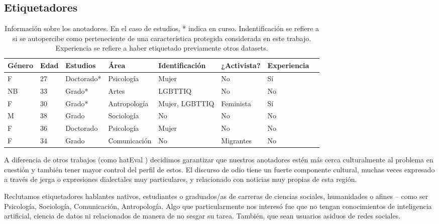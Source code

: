 \subsection{Etiquetadores}

%
%

\begin{table}[t]
    \centering
    \small
    \begin{tabularx}{\textwidth}{l l l l l l l l}
        Género& Edad  & Estudios    & Área          & Identificación    & ¿Activista?   & Experiencia\\
        \hline
        F    & 27     & Doctorado*  & Psicología    & Mujer             & No                   & Sí         \\
        NB   & 33     & Grado*      & Artes         & LGBTTIQ           & No                   & No         \\
        F    & 30     & Grado*      & Antropología  & Mujer, LGBTTIQ    & Feminista            & Sí         \\
        M    & 38     & Grado       & Sociología    & No                & No                   & No         \\
        F    & 36     & Doctorado   & Psicología    & Mujer             & No                   & No         \\
        F    & 34     & Grado       & Comunicación  & No                & Migrantes            & No         \\
        \hline
    \end{tabularx}
    \caption{Información sobre los anotadores. En el caso de estudios, * indica en curso. Indentificación se refiere a si se autopercibe como perteneciente de una característica protegida considerada en este trabajo. Experiencia se refiere a haber etiquetado previamente otros datasets. }
    \label{tab:informacion_sobre_anotadores}
\end{table}

A diferencia de otros trabajos (como hatEval \cite{hateval2019semeval}) decidimos garantizar que nuestros anotadores estén más cerca culturalmente al problema en cuestión y también tener mayor control del perfil de estos. El discurso de odio tiene un fuerte componente cultural, muchas veces expresado a través de jerga o expresiones dialectales muy particulares, y relacionado con noticias muy propias de esta región.

Reclutamos etiquetadores hablantes nativos, estudiantes o graduados/as de carreras de ciencias sociales, humanidades o afines -- como ser Psicología, Sociología, Comunicación, Antropología. Algo que particularmente nos interesó fue que no tengan conocimientos de inteligencia artificial, ciencia de datos ni relacionados de manera de no sesgar su tarea. También, que sean usuarios asiduos de redes sociales.

